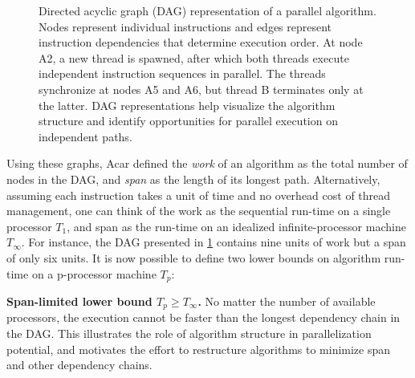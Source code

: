 \documentclass[english,12pt,a4paper,pdftex,sci,utf8]{aaltothesis}
\begin{document}
\begin{figure}[tbp]
\centering
{}
\caption{Directed acyclic graph (DAG) representation of a parallel algorithm. Nodes represent individual instructions and edges represent instruction dependencies that determine execution order. At node A2, a new thread is spawned, after which both threads execute independent instruction sequences in parallel. The threads synchronize at nodes A5 and A6, but thread B terminates only at the latter. DAG representations help visualize the algorithm structure and identify opportunities for parallel execution on independent paths.}
\label{fig:DAG-algo}
\end{figure}

Using these graphs, Acar \cite{acar2016parallel} defined the \emph{work} of an algorithm as the total number of nodes in the DAG, and \emph{span} as the length of its longest path. Alternatively, assuming each instruction takes a unit of time and no overhead cost of thread management, one can think of the work as the sequential run-time on a single processor $T_1$, and span as the run-time on an idealized infinite-processor machine $T_{\infty}$. For instance, the DAG presented in \cref{fig:DAG-algo} contains nine units of work but a span of only six units. It is now possible to define two lower bounds on algorithm run-time on a p-processor machine $T_p$:

\vspace{0.5\baselineskip}
\noindent\textbf{Span-limited lower bound $T_p \geq T_\infty$.} No matter the number of available processors, the execution cannot be faster than the longest dependency chain in the DAG. This illustrates the role of algorithm structure in parallelization potential, and motivates the effort to restructure algorithms to minimize span and other dependency chains.
\end{document}
